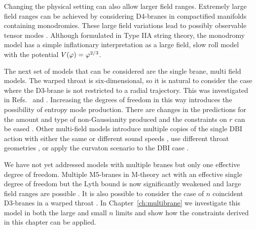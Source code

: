Changing the physical setting can also allow larger field ranges. Extremely large
field ranges can be achieved by considering
D4-branes in compactified manifolds containing monodromies. These large field
variations lead to possibly observable tensor modes
\cite{Silverstein:2008sg}. Although formulated in Type IIA string theory, the
monodromy model has a simple inflationary interpretation as a large field, slow roll
model with the potential $V(\varphi)=\varphi^{2/3}$. 


The next set of models that can be considered are the single brane, multi field
models. 
% 
The warped throat is six-dimensional, so it is natural to consider the case where
the D3-brane is not restricted to a radial trajectory. This was investigated in
Refs.~\cite{spinflation} and \cite{Huang:2007hh}. Increasing the degrees of
freedom in this way introduces the possibility of entropy mode production. There are
changes in the predictions for the amount and type of non-Gaussianity produced
and the constraints on $r$ can be eased \cite{Arroja:2008yy, Langlois:2009ej,
Langlois:2008qf, Langlois:2008wt, Mizuno:2009mv, Mizuno:2009cv}. 
% 
% 
Other multi-field models introduce multiple copies of the single DBI action with
either
the same or different sound speeds \cite{Cai:2008if, Cai:2009hw},  use
different throat geometries \cite{Gmeiner:2007uw},
or apply the curvaton scenario \cite{Lyth:2001nq} to the DBI case
\cite{Li:2008fm, Kobayashi:2009cm}.

We have not yet addressed models with multiple branes but only one effective
degree of freedom. Multiple M5-branes in M-theory act with an effective single
degree of freedom but the Lyth bound is now significantly weakened and large
field ranges are possible \cite{Krause:2007jr}. It is also possible to consider
the case of $n$ coincident D3-branes in a warped throat \cite{thomasward, hltw,
Ward:2007gs}. In Chapter~\ref{ch:multibrane} we investigate this model in both
the large and small $n$ limits and show how the constraints derived in this
chapter can be applied.


% 
% 
% 
